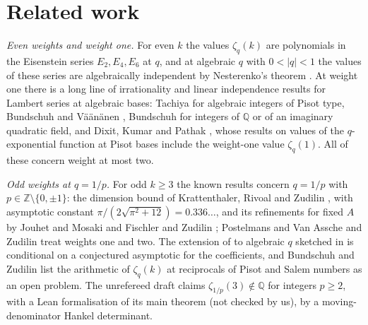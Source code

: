 \documentclass[11pt]{amsart}
\theoremstyle{definition}
\theoremstyle{remark}
\numberwithin{equation}{section}
\newcommand{\ZZ}{\mathbb{Z}}
\newcommand{\QQ}{\mathbb{Q}}
\begin{document}
\section{Related work}\label{sec:related}

\emph{Even weights and weight one.} For even $k$ the values $\zeta_q(k)$ are polynomials in the Eisenstein series
$E_2,E_4,E_6$ at $q$, and at algebraic $q$ with $0<|q|<1$ the values of these series are algebraically independent by
Nesterenko's theorem \cite{Nes96}. At weight one there is a long line of irrationality and linear independence results
for Lambert series at algebraic bases: Tachiya \cite{Tac04} for algebraic integers of Pisot type, Bundschuh and
V\"a\"an\"anen \cite{BV05,BV05b}, Bundschuh \cite{Bun07} for integers of $\QQ$ or of an imaginary quadratic field, and
Dixit, Kumar and Pathak \cite{DKP24}, whose results on values of the $q$-exponential function at Pisot bases include the
weight-one value $\zeta_q(1)$. All of these concern weight at most two.

\emph{Odd weights at $q=1/p$.} For odd $k\ge3$ the known results concern $q=1/p$ with $p\in\ZZ\setminus\{0,\pm1\}$:
the dimension bound of Krattenthaler, Rivoal and Zudilin \cite{KRZ06}, with asymptotic constant
$\pi/(2\sqrt{\pi^2+12})=0.336\ldots$, and its refinements for fixed $A$ by Jouhet and Mosaki \cite{JM10} and Fischler
and Zudilin \cite{FZ10}; Postelmans and Van Assche \cite{PVA07} and Zudilin \cite{Zud02} treat weights one and two. The
extension of \cite{KRZ06} to algebraic $q$ sketched in \cite[\S3.5]{KRZ06} is conditional on a conjectured asymptotic for
the coefficients, and Bundschuh and Zudilin \cite[\S6]{BZ07} list the arithmetic of $\zeta_q(k)$ at reciprocals of
Pisot and Salem numbers as an open problem. The unrefereed draft \cite{UPL} claims $\zeta_{1/p}(3)\notin\QQ$ for integers
$p\ge2$, with a Lean formalisation of its main theorem (not checked by us), by a moving-denominator Hankel determinant.
\end{document}
